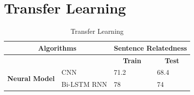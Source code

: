 \documentclass[12pt]{report} %
\begin{document}
\section{Transfer Learning}

\begin{table}[]
	\centering
	\caption{Transfer Learning}
	\label{my-label}
	\begin{tabular}{|l|l|l|l|}
		\hline
		\multicolumn{2}{|c|}{\textbf{Algorithms}}            & \multicolumn{2}{c|}{\textbf{Sentence Relatedness}}               \\ \hline
		&             & \multicolumn{1}{c|}{\textbf{Train}} & \multicolumn{1}{c|}{\textbf{Test}} \\ \hline
		\multirow{2}{*}{\textbf{Neural Model}} & CNN         & 71.2                                & 68.4                               \\ \cline{2-4} 
		& Bi-LSTM RNN & 78                                  & 74                                 \\ \hline
	\end{tabular}
\end{table}




 
\end{document}
